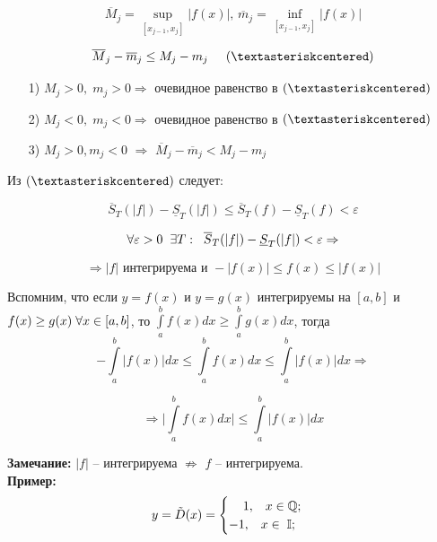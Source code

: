 \documentclass[a4paper,12pt]{article} %
\begin{document}
     $$ \overline{M}_j = \sup\limits_{[x_{j - 1}, x_j]} |f(x)| \text{, }\overline{m}_j =  \inf\limits_{[x_{j - 1}, x_j]} |f(x)| $$
     
     $$ \overline{M}_j - \overline{m}_j \leq M_j - m_j \hspace*{5mm} ( \textasteriskcentered )$$ 
     
     \begin{enumerate}
         \item [1)] $M_j > 0, \; m_j > 0 \Rightarrow$ очевидное равенство в $ (\textasteriskcentered) $
         \item [2)] $M_j < 0, \; m_j < 0  \Rightarrow$ очевидное равенство в $ (\textasteriskcentered) $
         \item [3)] $ M_j > 0, m_j < 0 $ $\Rightarrow$ $ \overline{M}_j - \overline{m}_j < M_j - m_j $
     \end{enumerate}
     
     Из $ (\textasteriskcentered) $ следует:
     
     $$ \overline{S}_T(|f|) -\underline{S}_T(|f|) \leq \overline{S}_T(f) -\underline{S}_T(f) < \varepsilon$$
     
     $$ \forall \varepsilon > 0 \hspace{2 mm} \exists T: \hspace{2 mm} \overline{S}_T(|f|) -\underline{S}_T(|f|) < \varepsilon \Rightarrow $$
     
     $$\Rightarrow |f| \text{ интегрируема и } - |f(x)| \leq f (x) \leq |f (x)| $$
     
     Вспомним, что если $ y = f(x) $ и $ y = g(x) $ интегрируемы на $ [a,b] $ и $ f(x) \geq g(x) \hspace{1 mm} \forall x \in [a, b]$, то $ \int\limits_a^b f(x)dx \geq \int\limits_a^b g(x)dx $, тогда \\ [1 mm]
     $$ - \int\limits_a^b |f(x)| dx \leq \int\limits_a^b f(x) dx \leq \int\limits_a^b |f(x)| dx \Rightarrow $$
     
     $$\Rightarrow \bigg|\int\limits_a^b f(x)dx\bigg| \leq \int\limits_a^b |f(x)|dx $$
     
     \textbf{Замечание:}
     $ |f| $ -- интегрируема $\not\Rightarrow$ $ f $  -- интегрируема.\\
     
     \textbf{Пример:} \\
     \begin{equation*}
    y = \tilde D(x) = \begin{cases}
        \hspace{4 mm}1, \hspace{3 mm} x \in \mathbb{Q};\\
        -1,  \hspace{3 mm} x \in \hspace{1 mm} \mathbb{I};
    \end{cases}
     \end{equation*} \\ [2 mm]
     
\end{document}
